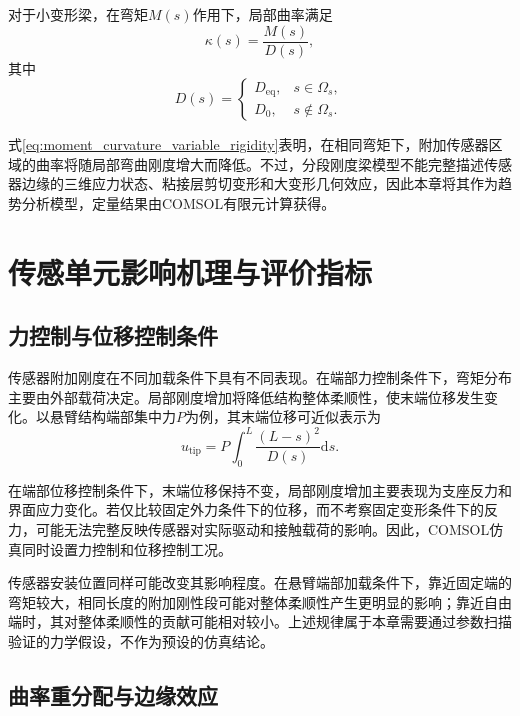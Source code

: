 对于小变形梁，在弯矩$M(s)$作用下，局部曲率满足
\begin{equation}
    \kappa(s)
    =
    \frac{M(s)}{D(s)},
    \label{eq:moment_curvature_variable_rigidity}
\end{equation}
其中
\begin{equation}
    D(s)
    =
    \begin{cases}
        D_{\mathrm{eq}}, & s\in\Omega_s,\\
        D_0, & s\notin\Omega_s.
    \end{cases}
    \label{eq:piecewise_flexural_rigidity}
\end{equation}

式\eqref{eq:moment_curvature_variable_rigidity}表明，在相同弯矩下，附加传感器区域的曲率将随局部弯曲刚度增大而降低。不过，分段刚度梁模型不能完整描述传感器边缘的三维应力状态、粘接层剪切变形和大变形几何效应，因此本章将其作为趋势分析模型，定量结果由COMSOL有限元计算获得。


\section{传感单元影响机理与评价指标}
\label{sec:influence_mechanism_metrics}

\subsection{力控制与位移控制条件}

传感器附加刚度在不同加载条件下具有不同表现。在端部力控制条件下，弯矩分布主要由外部载荷决定。局部刚度增加将降低结构整体柔顺性，使末端位移发生变化。以悬臂结构端部集中力$P$为例，其末端位移可近似表示为
\begin{equation}
    u_{\mathrm{tip}}
    =
    P
    \int_0^L
    \frac{(L-s)^2}{D(s)}
    \mathrm ds.
    \label{eq:tip_displacement_variable_rigidity}
\end{equation}

在端部位移控制条件下，末端位移保持不变，局部刚度增加主要表现为支座反力和界面应力变化。若仅比较固定外力条件下的位移，而不考察固定变形条件下的反力，可能无法完整反映传感器对实际驱动和接触载荷的影响。因此，COMSOL仿真同时设置力控制和位移控制工况。

传感器安装位置同样可能改变其影响程度。在悬臂端部加载条件下，靠近固定端的弯矩较大，相同长度的附加刚性段可能对整体柔顺性产生更明显的影响；靠近自由端时，其对整体柔顺性的贡献可能相对较小。上述规律属于本章需要通过参数扫描验证的力学假设，不作为预设的仿真结论。


\subsection{曲率重分配与边缘效应}

